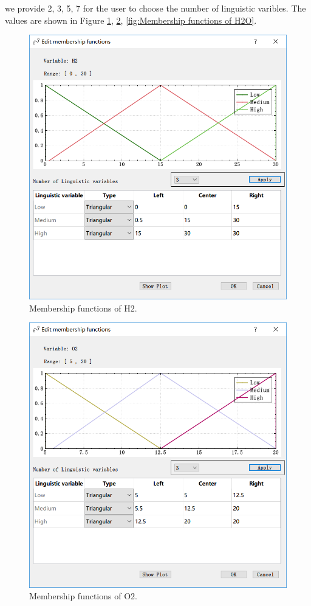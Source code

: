 \documentclass[journal,a4paper,onecolumn]{article}
\begin{document}
we provide 2, 3, 5, 7 for the user to choose the number of linguistic varibles. The values are shown in Figure \ref{fig:Membership functions of H2}, \ref{fig:Membership functions of O2}, \ref{fig:Membership functions of H2O}.

\begin{figure}[!hbt]
	\begin{center}
		\includegraphics[width=0.7\columnwidth]{fig9}
		\caption{Membership functions of H2.}
		\label{fig:Membership functions of H2}
	\end{center}
\end{figure}
\begin{figure}[!hbt]
	\begin{center}
		\includegraphics[width=0.7\columnwidth]{fig9_1}
		\caption{Membership functions of O2.}
		\label{fig:Membership functions of O2}
	\end{center}
\end{figure}
\end{document}
